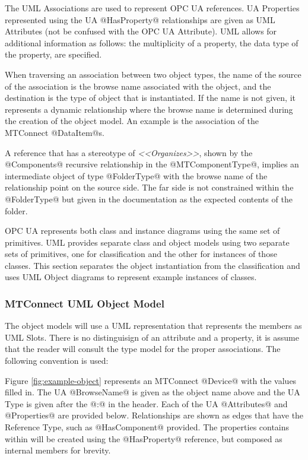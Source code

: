 The UML Associations are used to represent OPC UA references. UA Properties represented using the UA @Has\-Property@ relationships are given as UML Attributes (not be confused with the OPC UA Attribute). UML allows for additional information as follows:  the multiplicity of a property, the data type of the property, are specified.



When traversing an association between two object types, the name of the source of the association is the browse name associated with the object, and the destination is the type of object that is instantiated. If the name is not given, it represents a dynamic relationship where the browse name is determined during the creation of the object model. An example is the association of the MTConnect @DataItem@s.

A reference that has a stereotype of \textit{<<Organizes>>}, shown by the @Components@ recursive relationship in the @MTComponentType@, implies an intermediate object of type @FolderType@ with the browse name of the relationship point on the source side. The far side is not constrained within the @FolderType@ but given in the documentation as the expected contents of the folder.

OPC UA represents both class and instance diagrams using the same set of primitives. UML provides separate class and object models using two separate sets of primitives, one for classification and the other for instances of those classes. This section separates the object instantiation from the classification and uses UML Object diagrams to represent example instances of classes.

\FloatBarrier

\subsubsection{MTConnect UML Object Model}

The object models will use a UML representation that represents the members as UML Slots. There is no distinguisign of an attribute and a property, it is assume that the reader will consult the type model for the proper associations. The following convention is used:



Figure \ref{fig:example-object} represents an MTConnect @Device@ with the values filled in. The UA @BrowseName@ is given as the object name above and the UA Type is given after the @:@ in the header. Each of the UA @Attributes@ and @Properties@ are provided below. Relationships are shown as edges that have the Reference Type, such as @HasComponent@ provided. The properties contains within will be created using the @HasProperty@ reference, but composed as internal members for brevity.

